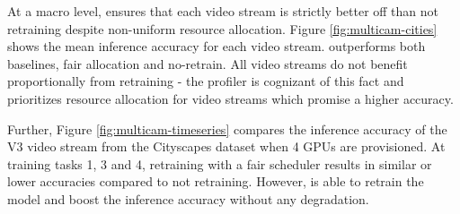 At a macro level, \name{} ensures that each video stream is strictly better off than not retraining despite non-uniform resource allocation. Figure \ref{fig:multicam-cities} shows the mean inference accuracy for each video stream. \name{} outperforms both baselines, fair allocation and no-retrain. All video streams do not benefit proportionally from retraining - the \name{} profiler is cognizant of this fact and prioritizes resource allocation for video streams which promise a higher accuracy.


Further, Figure \ref{fig:multicam-timeseries} compares the inference accuracy of the V3 video stream from the Cityscapes dataset when 4 GPUs are provisioned. At training tasks 1, 3 and 4, retraining with a fair scheduler results in similar or lower accuracies compared to not retraining. However, \name{} is able to retrain the model and boost the inference accuracy without any degradation. 







